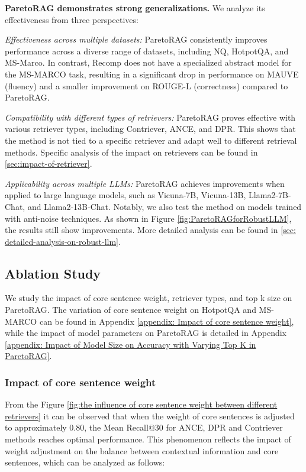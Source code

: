 \textbf{ParetoRAG  demonstrates strong generalizations.} We analyze its effectiveness from three perspectives:


\textit{Effectiveness across multiple datasets: }ParetoRAG consistently improves performance across a diverse range of datasets, including NQ, HotpotQA, and MS-Marco. 
In contrast, Recomp does not have a specialized abstract model for the MS-MARCO task, resulting in a significant drop in performance on MAUVE (fluency) and a smaller improvement on ROUGE-L (correctness) compared to ParetoRAG.

\textit{Compatibility with different types of retrievers:} ParetoRAG proves effective with various retriever types, including Contriever, ANCE, and DPR. This shows that the method is not tied to a specific retriever and adapt well to different retrieval methods. Specific analysis of the impact on retrievers can be found in \ref{sec:impact-of-retriever}.
    
\textit{Applicability across multiple LLMs:} ParetoRAG achieves improvements when applied to large language models, such as Vicuna-7B, Vicuna-13B, Llama2-7B-Chat, and Llama2-13B-Chat. Notably, we also test the method on models trained with anti-noise techniques. As shown in Figure \ref{fig:ParetoRAGforRobustLLM}, the results still show improvements. More detailed analysis can be found in \ref{sec: detailed-analysis-on-robust-llm}. 





\subsection{Ablation Study}
We study the impact of core sentence weight, retriever types, and top k size on ParetoRAG. The variation of core sentence weight on HotpotQA and MS-MARCO can be found in Appendix \ref{appendix: Impact of core sentence weight}, while the impact of model parameters on ParetoRAG is detailed in Appendix \ref{appendix: Impact of Model Size on Accuracy with Varying Top K in ParetoRAG}.

\subsubsection{Impact of core sentence weight}

 From the Figure \ref{fig:the influence of core sentence weight between different retrievers}  it can be observed that when the weight of core sentences is adjusted to approximately 0.80, the Mean Recall@30 for ANCE, DPR and Contriever methods reaches optimal performance. This phenomenon reflects the impact of weight adjustment on the balance between contextual information and core sentences, which can be analyzed as follows:
 
